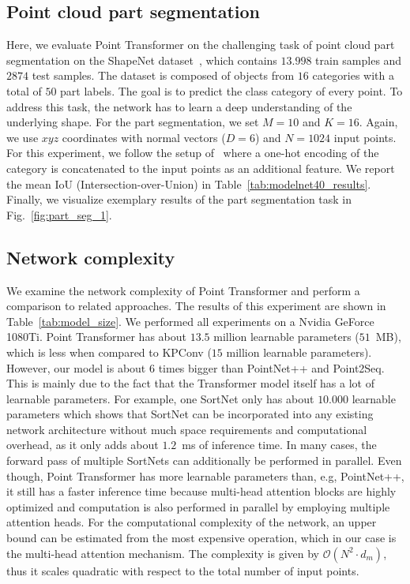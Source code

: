 \documentclass{ieeeaccess}
\begin{document}
\subsection{Point cloud part segmentation}
Here, we evaluate Point Transformer on the challenging task of point cloud part segmentation on the ShapeNet dataset~\cite{shapenet2015}, which contains $13.998$ train samples and $2874$ test samples. The dataset is composed of objects from $16$ categories with a total of $50$ part labels. The goal is to predict the class category of every point. To address this task, the network has to learn a deep understanding of the underlying shape. For the part segmentation, we set $M=10$ and $K=16$. Again, we use $xyz$ coordinates with normal vectors ($D=6$) and $N=1024$ input points. For this experiment, we follow the setup of~\cite{qi2017pointnet} where a one-hot encoding of the  category is concatenated to the input points as an additional feature. We report the mean IoU (Intersection-over-Union) in Table~\ref{tab:modelnet40_results}. Finally, we visualize exemplary results of the part segmentation task in Fig.~\ref{fig:part_seg_1}.


\subsection{Network complexity}
We examine the network complexity of Point Transformer and perform a comparison to related approaches. The results of this experiment are shown in Table~\ref{tab:model_size}. We performed all experiments on a Nvidia GeForce 1080Ti. Point Transformer has about $13.5$ million learnable parameters ($51$~MB), which is less when compared to KPConv ($15$ million learnable parameters). However, our model is about $6$ times bigger than PointNet++ and Point2Seq. This is mainly due to the fact that the Transformer model itself has a lot of learnable parameters. For example, one SortNet only has about $10.000$ learnable parameters which shows that SortNet can be incorporated into any existing network architecture without much space requirements and computational overhead, as it only adds about $1.2$~ms of inference time. In many cases, the forward pass of multiple SortNets can additionally be performed in parallel. Even though, Point Transformer has more learnable parameters than, e.g, PointNet++, it still has a faster inference time because multi-head attention blocks are highly optimized and computation is also performed in parallel by employing multiple attention heads. For the computational complexity of the network, an upper bound can be estimated from the most expensive operation, which in our case is the multi-head attention mechanism. The complexity is given by $\mathcal{O}(N^2\cdot d_m)$, thus it scales quadratic with respect to the total number of input points.
\end{document}
